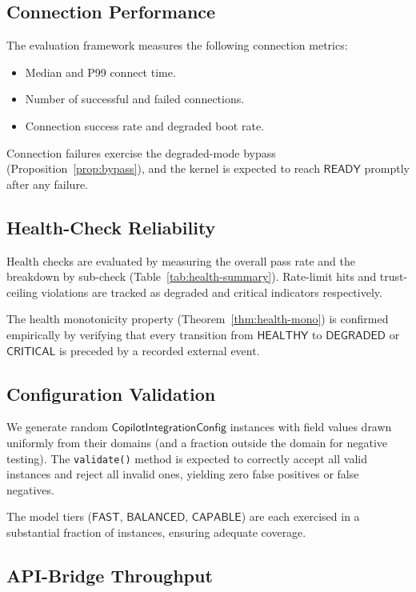 \documentclass[11pt]{article}
\newcommand{\CIC}{\mathsf{CopilotIntegrationConfig}}
\newcommand{\FAST}{\mathsf{FAST}}
\newcommand{\BALANCED}{\mathsf{BALANCED}}
\newcommand{\CAPABLE}{\mathsf{CAPABLE}}
\newcommand{\READY}{\mathsf{READY}}
\begin{document}
\subsection{Connection Performance}

The evaluation framework measures the following connection metrics:

\begin{itemize}
\item Median and P99 connect time.
\item Number of successful and failed connections.
\item Connection success rate and degraded boot rate.
\end{itemize}

Connection failures exercise the degraded-mode bypass
(Proposition~\ref{prop:bypass}), and the kernel is expected to
reach $\READY$ promptly after any failure.

\subsection{Health-Check Reliability}

Health checks are evaluated by measuring the overall pass rate and
the breakdown by sub-check (Table~\ref{tab:health-summary}).
Rate-limit hits and trust-ceiling violations are tracked as
degraded and critical indicators respectively.

The health monotonicity property
(Theorem~\ref{thm:health-mono}) is confirmed empirically by
verifying that every transition from $\mathsf{HEALTHY}$ to
$\mathsf{DEGRADED}$ or $\mathsf{CRITICAL}$ is preceded by a
recorded external event.

\subsection{Configuration Validation}

We generate random $\CIC$ instances with
field values drawn uniformly from their domains (and a fraction outside
the domain for negative testing).  The \texttt{validate()} method
is expected to correctly accept all valid instances and reject all
invalid ones, yielding zero false positives or false negatives.

The model tiers ($\FAST$, $\BALANCED$,
$\CAPABLE$) are each exercised in a substantial fraction of
instances, ensuring adequate coverage.

\subsection{API-Bridge Throughput}
\end{document}
